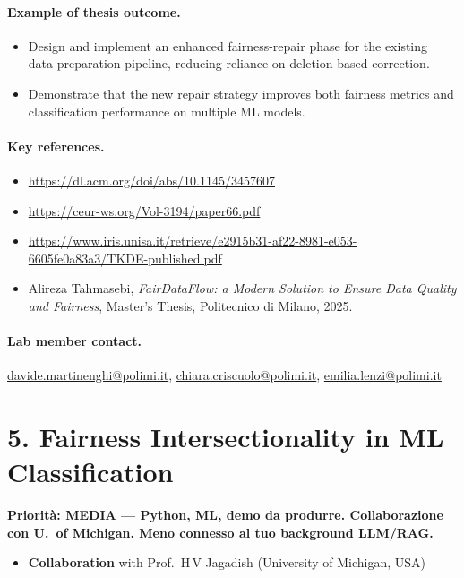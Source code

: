 \documentclass[a4paper,11pt]{article}
\newcommand{\priorita}[1]{%
  \par\smallskip\noindent\textbf{Priorit\`a: #1}\par\smallskip
}
\begin{document}
\paragraph{Example of thesis outcome.}
\begin{itemize}[nosep]
  \item Design and implement an enhanced fairness-repair phase for the existing data-preparation pipeline, reducing reliance on deletion-based correction.
  \item Demonstrate that the new repair strategy improves both fairness metrics and classification performance on multiple ML models.
\end{itemize}

\paragraph{Key references.}
\begin{itemize}[nosep]
  \item \url{https://dl.acm.org/doi/abs/10.1145/3457607}
  \item \url{https://ceur-ws.org/Vol-3194/paper66.pdf}
  \item \url{https://www.iris.unisa.it/retrieve/e2915b31-af22-8981-e053-6605fe0a83a3/TKDE-published.pdf}
  \item Alireza Tahmasebi, \emph{FairDataFlow: a Modern Solution to Ensure Data Quality and Fairness}, Master's Thesis, Politecnico di Milano, 2025.
\end{itemize}

\paragraph{Lab member contact.}
\url{davide.martinenghi@polimi.it}, \url{chiara.criscuolo@polimi.it}, \url{emilia.lenzi@polimi.it}


\section{5. Fairness Intersectionality in ML Classification}

\priorita{MEDIA --- Python, ML, demo da produrre. Collaborazione con U.~of Michigan. Meno connesso al tuo background LLM/RAG.}

\begin{itemize}[nosep]
  \item \textbf{Collaboration} with Prof.\ H\,V Jagadish (University of Michigan, USA)
\end{itemize}
\end{document}
